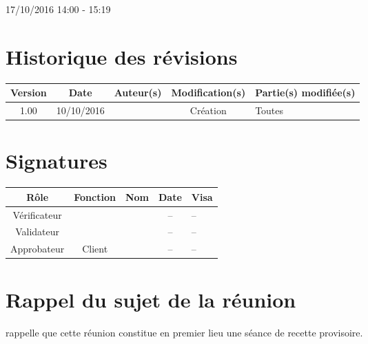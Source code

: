 \documentclass [a4paper] {article}
\begin{document}
17/10/2016			 				%
\hfill   
\hfill 	 14:00 - 15:19 				%


\section*{Historique des révisions}
\begin{center}
			\begin{tabular}{| c | c | c | c | p{4cm} |}
				\hline
				\rowcolor{Gray}
				Version & Date & Auteur(s) & Modification(s) & Partie(s) modifiée(s)		 \\
				\hline
				1.00 & 10/10/2016 & \Kafui & Création & Toutes \\
		\hline		
			\end{tabular}
		\end{center}

\section*{Signatures}

		\begin{center}
			\begin{tabular}{| c | c | c | c | p{4cm} |}
				\hline
				\rowcolor{Gray}
				Rôle & Fonction & Nom & Date & Visa		 \\
				\hline
				Vérificateur & \RGC & \Melissa & -- & -- \\[30pt]
				\hline
				Validateur & \CP & \Pierre & -- & -- \\[30pt]	
				\hline
				Approbateur & Client & \nomClient & -- & -- \\[30pt]	
				\hline
			\end{tabular}
		\end{center}


\section{Rappel du sujet de la réunion}
\Pierre{} rappelle que cette réunion constitue en premier lieu une séance de recette provisoire.
\end{document}
